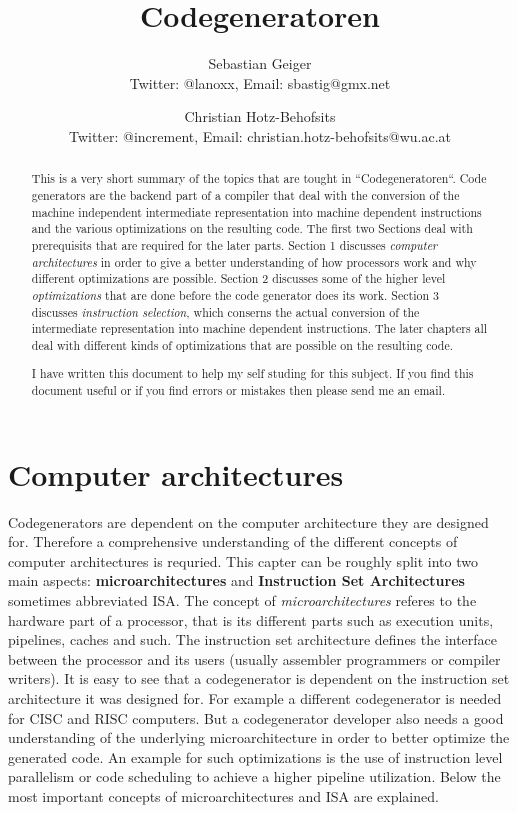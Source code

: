 \documentclass[a4paper,10pt]{article}
\title{Codegeneratoren}
\author{Sebastian Geiger\\ \small{Twitter: @lanoxx, Email: sbastig@gmx.net}}
\author{Christian Hotz-Behofsits\\ \small{Twitter: @increment, Email: christian.hotz-behofsits@wu.ac.at}}
\begin{document}
\maketitle

\begin{abstract}
This is a very short summary of the topics that are tought in ``Codegeneratoren``. Code generators are the backend part of a compiler
that deal with the conversion of the machine independent intermediate representation into machine dependent instructions and the various
optimizations on the resulting code. The first two Sections deal with prerequisits that are required for the later parts. Section 1
discusses \textit{computer architectures} in order to give a better understanding of how processors work and why different optimizations
are possible. Section 2 discusses some of the higher level \textit{optimizations} that are done before the code generator does its work.
Section 3 discusses \textit{instruction selection}, which conserns the actual conversion of the intermediate representation into machine
dependent instructions. The later chapters all deal with different kinds of optimizations that are possible on the resulting code.

I have written this document to help my self studing for this subject. If you find this document useful or if you find errors or mistakes
then please send me an email.
\end{abstract}

\tableofcontents

\section{Computer architectures}
Codegenerators are dependent on the computer architecture they are designed for. Therefore a comprehensive understanding of the different
concepts of computer architectures is requried. This capter can be roughly split into two main aspects: \textbf{microarchitectures} and
\textbf{Instruction Set Architectures} sometimes abbreviated ISA. The concept of \textit{microarchitectures} referes to the hardware part
of a processor, that is its different parts such as execution units, pipelines, caches and such. The instruction set architecture defines
the interface between the processor and its users (usually assembler programmers or compiler writers). It is easy to see that a
codegenerator is dependent on the instruction set architecture it was designed for. For example a different codegenerator is needed for
CISC and RISC computers. But a codegenerator developer also needs a good understanding of the underlying microarchitecture in order to
better optimize the generated code. An example for such optimizations is the use of instruction level parallelism or code scheduling to
achieve a higher pipeline utilization. Below the most important concepts of microarchitectures and ISA are explained.
\end{document}
